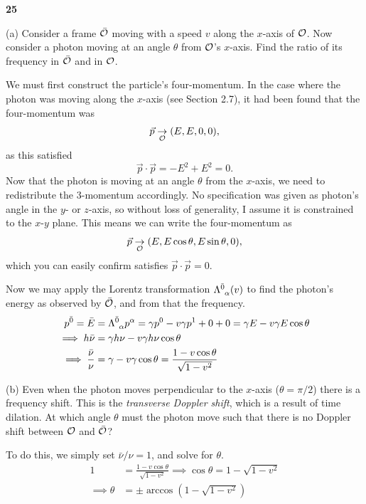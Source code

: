 \documentclass[gr-notes.tex]{subfiles}
\begin{document}
\textbf{25}

(a) Consider a frame $\bar{\mathcal{O}}$ moving with a speed $v$ along the $x$-axis of $\mathcal{O}$. Now consider a photon moving at an angle $\theta$ from $\mathcal{O}$'s $x$-axis. Find the ratio of its frequency in $\bar{\mathcal{O}}$ and in $\mathcal{O}$.

We must first construct the particle's four-momentum. In the case where the photon was moving along the $x$-axis (see Section 2.7), it had been found that the four-momentum was
%
\begin{displaymath}
  \vec{p} \underset{\mathcal{O}}{\to} (E, E, 0, 0),
\end{displaymath}
%
as this satisfied
%
\begin{displaymath}
  \vec{p} \cdot \vec{p} =
  -E^2 + E^2 =
  0.
%
  \tag{Schutz 2.37}
  \label{schutz:2.37}
\end{displaymath}
%
Now that the photon is moving at an angle $\theta$ from the $x$-axis, we need to redistribute the 3-momentum accordingly. No specification was given as photon's angle in the $y$- or $z$-axis, so without loss of generality, I assume it is constrained to the $x$-$y$ plane. This means we can write the four-momentum as
%
\begin{displaymath}
  \vec{p} \underset{\mathcal{O}}{\to} (E, E \cos\theta, E \sin\theta, 0),
\end{displaymath}
%
which you can easily confirm satisfies $\vec{p} \cdot \vec{p} = 0$.

Now we may apply the Lorentz transformation $\tensor{\Lambda}{^{\bar0}_\alpha}(v)$ to find the photon's energy as observed by $\bar{\mathcal{O}}$, and from that the frequency.
%
\begin{align*}
  p^{\bar0} =
  \bar{E} &=
  \tensor{\Lambda}{^{\bar0}_\alpha} p^\alpha =
  \gamma p^0 - v \gamma p^1 + 0 + 0 =
  \gamma E - v \gamma E \cos\theta
  \\ \implies
  h \bar\nu &=
  \gamma h \nu - v \gamma h \nu \cos\theta
  \\ \implies
  \frac{\bar\nu}{\nu} &=
  \gamma - v \gamma \cos\theta =
  \frac{1 - v \cos\theta}{\sqrt{1 - v^2}}
\end{align*}


(b) Even when the photon moves perpendicular to the $x$-axis ($\theta = \pi/2$) there is a frequency shift. This is the \emph{transverse Doppler shift}, which is a result of time dilation. At which angle $\theta$ must the photon move such that there is no Doppler shift between $\mathcal{O}$ and $\bar{\mathcal{O}}$?

To do this, we simply set $\bar\nu / \nu = 1$, and solve for $\theta$.
%
\begin{align*}
  1 &=
  \frac{1 - v \cos\theta}{\sqrt{1 - v^2}} \implies
  \cos\theta = 1 - \sqrt{1 - v^2}
  \\ \implies
  \theta &=
  \pm \arccos(1 - \sqrt{1 - v^2})
\end{align*}
\end{document}

